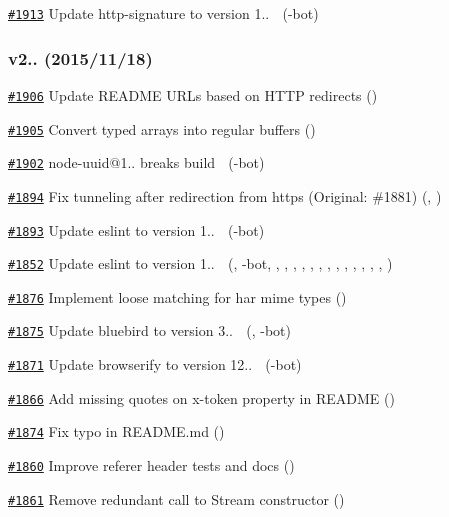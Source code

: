 \begin{DoxyItemize}
\item \href{https://github.com/request/request/pull/1913}{\tt \#1913} Update http-\/signature to version 1.. 🚀 (-\/bot)
\end{DoxyItemize}

\subsubsection*{v2.. (2015/11/18)}


\begin{DoxyItemize}
\item \href{https://github.com/request/request/pull/1906}{\tt \#1906} Update R\+E\+A\+D\+ME U\+R\+Ls based on H\+T\+TP redirects ()
\item \href{https://github.com/request/request/pull/1905}{\tt \#1905} Convert typed arrays into regular buffers ()
\item \href{https://github.com/request/request/pull/1902}{\tt \#1902} node-\/uuid@1.. breaks build 🚨 (-\/bot)
\item \href{https://github.com/request/request/pull/1894}{\tt \#1894} Fix tunneling after redirection from https (Original\+: \#1881) (, )
\item \href{https://github.com/request/request/pull/1893}{\tt \#1893} Update eslint to version 1.. 🚀 (-\/bot)
\item \href{https://github.com/request/request/pull/1852}{\tt \#1852} Update eslint to version 1.. 🚀 (, -\/bot, , , , , , , , , , , , , , )
\item \href{https://github.com/request/request/pull/1876}{\tt \#1876} Implement loose matching for har mime types ()
\item \href{https://github.com/request/request/pull/1875}{\tt \#1875} Update bluebird to version 3.. 🚀 (, -\/bot)
\item \href{https://github.com/request/request/pull/1871}{\tt \#1871} Update browserify to version 12.. 🚀 (-\/bot)
\item \href{https://github.com/request/request/pull/1866}{\tt \#1866} Add missing quotes on x-\/token property in R\+E\+A\+D\+ME ()
\item \href{https://github.com/request/request/pull/1874}{\tt \#1874} Fix typo in R\+E\+A\+D\+M\+E.\+md ()
\item \href{https://github.com/request/request/pull/1860}{\tt \#1860} Improve referer header tests and docs ()
\item \href{https://github.com/request/request/pull/1861}{\tt \#1861} Remove redundant call to Stream constructor ()

\end{DoxyItemize}
